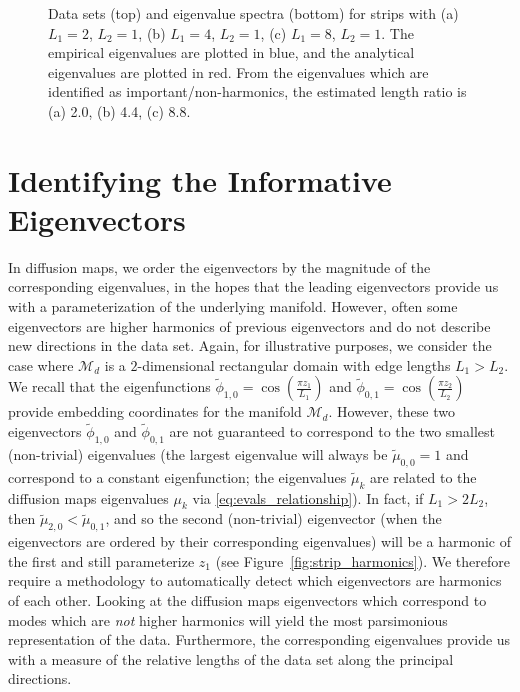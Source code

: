 \documentclass[preprint]{elsarticle}
\begin{document}
\begin{figure}[t]
\begin{subfigure}{0.35\textwidth}
\caption{}
\end{subfigure}
%
\caption{Data sets (top) and eigenvalue spectra (bottom) for strips with (a) $L_1 = 2$, $L_2 = 1$, (b) $L_1 = 4$, $L_2 = 1$, (c) $L_1 = 8$, $L_2 = 1$. The empirical eigenvalues are plotted in blue, and the analytical eigenvalues are plotted in red. From the eigenvalues which are identified as important/non-harmonics, the estimated length ratio is (a) 2.0, (b) 4.4, (c) 8.8.  }
\label{fig:strip_compare_analytic}
\end{figure}


\section{Identifying the Informative Eigenvectors }



In diffusion maps, we order the eigenvectors by the magnitude of the corresponding eigenvalues, in the hopes that the leading eigenvectors provide us with a parameterization of the underlying manifold.
%
However, often some eigenvectors are higher harmonics of previous eigenvectors and do not describe new directions in the data set.
%
Again, for illustrative purposes, we consider the case where $\mathcal{M}_d$ is a $2$-dimensional rectangular domain with edge lengths $L_1  > L_2$. 
%
We recall that the eigenfunctions $\tilde{\phi}_{1,0} = \cos \left( \frac {\pi z_1}{L_1} \right)$ and  $\tilde{\phi}_{0,1} = \cos \left( \frac {\pi z_2}{L_2} \right)$ provide embedding coordinates for the manifold $\mathcal{M}_d$. 
%
However, these two eigenvectors $\tilde{\phi}_{1, 0}$ and $\tilde{\phi}_{0, 1}$ are not guaranteed to correspond to the two smallest (non-trivial) eigenvalues (the largest eigenvalue will always be $\tilde{\mu}_{0,0} = 1$ and correspond to a constant eigenfunction; the eigenvalues $\tilde{\mu}_k$ are related to the diffusion maps eigenvalues $\mu_k$ via \eqref{eq:evals_relationship}). 
%
In fact, if $L_1 > 2 L_2$, then $\tilde{\mu}_{2, 0} < \tilde{\mu}_{0, 1}$, and so the second (non-trivial) eigenvector (when the eigenvectors are ordered by their corresponding eigenvalues) will be a harmonic of the first and still parameterize $z_1$ (see Figure~\ref{fig:strip_harmonics}).
%
We therefore require a methodology to automatically detect which eigenvectors are harmonics of each other. 
%
Looking at the diffusion maps eigenvectors which correspond to modes which are {\em not} higher harmonics will yield the most parsimonious representation of the data.
%
Furthermore, the corresponding eigenvalues provide us with a measure of the relative lengths of the data set along the principal directions. 
\end{document}
